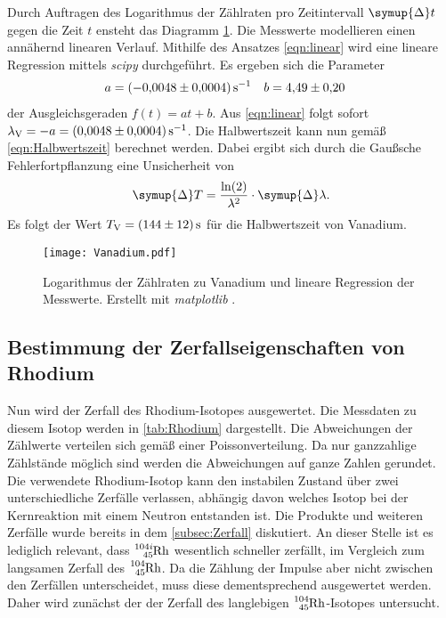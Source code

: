 Durch Auftragen des Logarithmus der Zählraten pro Zeitintervall $\symup{\Delta}t$ gegen die Zeit $t$ ensteht das Diagramm \ref{fig:Vanadium}. Die Messwerte modellieren einen 
annähernd linearen Verlauf. Mithilfe des Ansatzes \eqref{eqn:linear} wird eine lineare Regression mittels \textit{scipy} \cite{scipy} durchgeführt.
Es ergeben sich die Parameter
\begin{align*}
  a &= \qty{-0.0048+-0.0004}{\second^{-1}} & b &= \num{ 4.49+-0.20}
\end{align*}
der Ausgleichsgeraden $f(t) = at + b$. Aus \autoref{eqn:linear} folgt sofort $\lambda_\text{V} = -a = \qty{0.0048+-0.0004}{\second^{-1}}$. Die Halbwertszeit kann nun gemäß 
\autoref{eqn:Halbwertszeit} berechnet werden. Dabei ergibt sich durch die Gaußsche Fehlerfortpflanzung eine Unsicherheit von 
\begin{equation}
  \label{eqn:delta_T}
  \symup{\Delta}T = \frac{\ln(2)}{\lambda^2} \cdot \symup{\Delta} \lambda. 
\end{equation}
Es folgt der Wert $T_\text{V} = \qty{144+-12}{\second}$ für die Halbwertszeit von Vanadium. 

\begin{figure}
  \centering
  \texttt{[image: Vanadium.pdf]}
  \caption{Logarithmus der Zählraten zu Vanadium und lineare Regression der Messwerte. Erstellt mit \textit{matplotlib} \cite{matplotlib}.}
  \label{fig:Vanadium}
\end{figure}

\subsection{Bestimmung der Zerfallseigenschaften von Rhodium}
\label{subsec:A_Rhodium}

Nun wird der Zerfall des Rhodium-Isotopes ausgewertet. Die Messdaten zu diesem Isotop werden in \autoref{tab:Rhodium} dargestellt. Die Abweichungen der Zählwerte
verteilen sich gemäß einer Poissonverteilung. Da nur ganzzahlige Zählstände möglich sind werden die Abweichungen auf ganze Zahlen gerundet. Die verwendete Rhodium-Isotop kann 
den instabilen Zustand über zwei unterschiedliche Zerfälle verlassen, abhängig davon welches Isotop bei der Kernreaktion mit einem Neutron entstanden ist. Die Produkte und
weiteren Zerfälle wurde bereits in dem \autoref{subsec:Zerfall} diskutiert.
An dieser Stelle ist es lediglich relevant, dass  $\ce{^{104i}_{45}Rh}$ wesentlich schneller zerfällt, im Vergleich zum langsamen Zerfall des $\ce{^{104}_{45}Rh}$.
Da die Zählung der Impulse aber nicht zwischen den Zerfällen unterscheidet, muss diese dementsprechend ausgewertet werden. Daher wird zunächst der 
der Zerfall des langlebigen $\ce{^{104}_{45}Rh}$-Isotopes untersucht.

